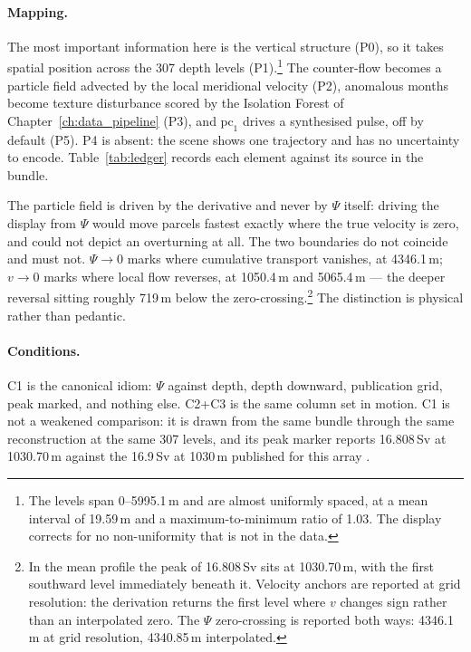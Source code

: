 \paragraph{Mapping.} The most important information here is the vertical structure (P0), so it takes spatial position across the 307 depth levels (P1).\footnote{The levels span 0--5995.1\,m and are almost uniformly spaced, at a mean interval of 19.59\,m and a maximum-to-minimum ratio of 1.03. The display corrects for no non-uniformity that is not in the data.} The counter-flow becomes a particle field advected by the local meridional velocity (P2), anomalous months become texture disturbance scored by the Isolation Forest of Chapter~\ref{ch:data_pipeline} (P3), and $\mathrm{pc}_1$ drives a synthesised pulse, off by default (P5). P4 is absent: the scene shows one trajectory and has no uncertainty to encode. Table~\ref{tab:ledger} records each element against its source in the bundle.

The particle field is driven by the derivative and never by $\Psi$ itself: driving the display from $\Psi$ would move parcels fastest exactly where the true velocity is zero, and could not depict an overturning at all. The two boundaries do not coincide and must not. $\Psi \to 0$ marks where cumulative transport vanishes, at 4346.1\,m; $v \to 0$ marks where local flow reverses, at 1050.4\,m and 5065.4\,m --- the deeper reversal sitting roughly 719\,m below the zero-crossing.\footnote{In the mean profile the peak of 16.808\,Sv sits at 1030.70\,m, with the first southward level immediately beneath it. Velocity anchors are reported at grid resolution: the derivation returns the first level where $v$ changes sign rather than an interpolated zero. The $\Psi$ zero-crossing is reported both ways: 4346.1\,m at grid resolution, 4340.85\,m interpolated.} The distinction is physical rather than pedantic.

\paragraph{Conditions.} C1 is the canonical idiom: $\Psi$ against depth, depth downward, publication grid, peak marked, and nothing else. C2+C3 is the same column set in motion.%
C1 is not a weakened comparison: it is drawn from the same bundle through the same reconstruction at the same 307 levels, and its peak marker reports 16.808\,Sv at 1030.70\,m against the 16.9\,Sv at 1030\,m published for this array \parencite{smeed2018}.

